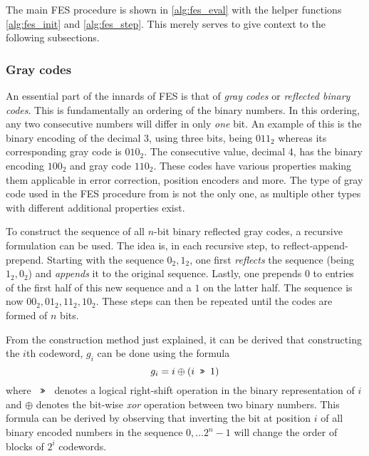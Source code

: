 
The main FES procedure is shown in \cref{alg:fes_eval} with the helper functions \cref{alg:fes_init} and \cref{alg:fes_step}. This merely serves to give context to the following subsections.

\subsubsection{Gray codes} \label{sec:prereq:fes:gray_codes}

An essential part of the innards of FES is that of \textit{gray codes} or \textit{reflected binary codes}. This is fundamentally an ordering of the binary numbers. In this ordering, any two consecutive numbers will differ in only \textit{one} bit. An example of this is the binary encoding of the decimal 3, using three bits, being $011_2$ whereas its corresponding gray code is $010_2$.
The consecutive value, decimal 4, has the binary encoding $100_2$ and gray code $110_2$. These codes have various properties making them applicable in error correction, position encoders and more. The type of gray code used in the FES procedure from \cite{ches-2010-23990, cryptoeprint:2013/436} is not the only one, as multiple other types with different additional properties exist.

To construct the sequence of all $n$-bit binary reflected gray codes, a recursive formulation can be used. The idea is, in each recursive step, to reflect-append-prepend. Starting with the sequence $0_2, 1_2$, one first \textit{reflects} the sequence (being $1_2, 0_2$) and \textit{appends} it to the original sequence. Lastly, one prepends $0$ to entries of the first half of this new sequence and a $1$ on the latter half. The sequence is now $00_2, 01_2, 11_2, 10_2$. These steps can then be repeated until the codes are formed of $n$ bits.

From the construction method just explained, it can be derived that constructing the $i$th codeword, $g_i$ can be done using the formula
$$
    g_i = i \oplus (i \texttt{ >> } 1)
$$
where $\texttt{ >> }$ denotes a logical right-shift operation in the binary representation of $i$ and $\oplus$ denotes the bit-wise \textit{xor} operation between two binary numbers. This formula can be derived by observing that inverting the bit at position $i$ of all binary encoded numbers in the sequence $0,\dots 2^{n} - 1$ will change the order of blocks of $2^i$ codewords.

